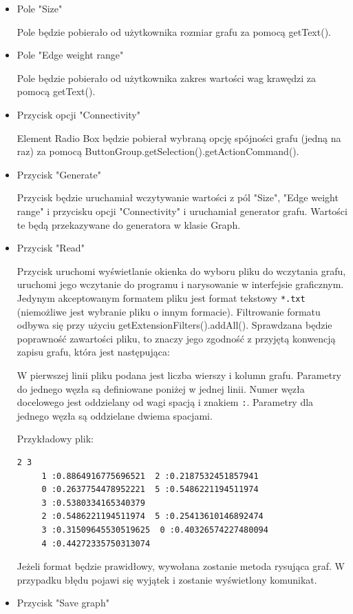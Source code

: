 \documentclass[]{article}
\begin{document}
\begin{itemize}
    \item Pole "Size"
    
    Pole będzie pobierało od użytkownika rozmiar grafu za pomocą getText().
    \item Pole "Edge weight range"
    
    Pole będzie pobierało od użytkownika zakres wartości wag krawędzi za pomocą getText().
    \item Przycisk opcji "Connectivity"
    
    Element Radio Box będzie pobierał wybraną opcję spójności grafu (jedną na raz) za pomocą ButtonGroup.getSelection().getActionCommand().
    \item Przycisk "Generate"
    
    Przycisk będzie uruchamiał wczytywanie wartości z pól "Size", "Edge weight range" i przycisku opcji "Connectivity" i uruchamiał generator grafu. Wartości te będą przekazywane do generatora w klasie Graph.
    \item Przycisk "Read"
    
    Przycisk uruchomi wyświetlanie okienka do wyboru pliku do wczytania grafu, uruchomi jego wczytanie do programu i narysowanie w interfejsie graficznym. Jedynym akceptowanym formatem pliku jest format tekstowy \texttt{*.txt} (niemożliwe jest wybranie pliku o innym formacie). Filtrowanie formatu odbywa się przy użyciu getExtensionFilters().addAll(). Sprawdzana będzie poprawność zawartości pliku, to znaczy jego zgodność z przyjętą konwencją zapisu grafu, która jest następująca:
    
    W pierwszej linii pliku podana jest liczba wierszy i kolumn grafu. Parametry do jednego węzła są definiowane poniżej w jednej linii. Numer węzła docelowego jest oddzielany od wagi spacją i znakiem \texttt{:}. Parametry dla jednego węzła są oddzielane dwiema spacjami.
    
    Przykładowy plik:
    \begin{verbatim}
2 3
	 1 :0.8864916775696521  2 :0.2187532451857941 
	 0 :0.2637754478952221  5 :0.5486221194511974
	 3 :0.5380334165340379
	 2 :0.5486221194511974  5 :0.25413610146892474
	 3 :0.31509645530519625  0 :0.40326574227480094
	 4 :0.44272335750313074
\end{verbatim}
    Jeżeli format będzie prawidłowy, wywołana zostanie metoda rysująca graf. W przypadku błędu pojawi się wyjątek i zostanie wyświetlony komunikat.
    
    \item Przycisk "Save graph"
    

\end{itemize}
\end{document}
